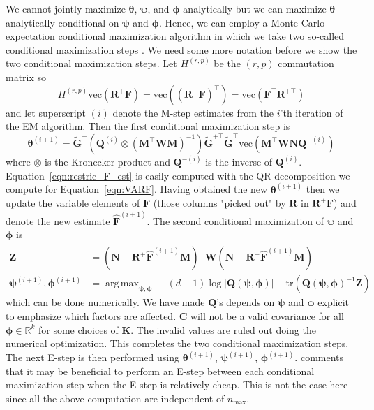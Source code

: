 \documentclass[notitlepage]{article}
\DeclareMathOperator*{\argmax}{arg\,max}
\renewcommand{\vec}[1]{\bm{#1}}
\newcommand{\mat}[1]{\mathbf{#1}}
\newcommand{\Lparen}[1]{\left( #1\right)}
\newcommand{\Lvert}[1]{\left\vert #1\right\vert}
\newcommand{\optor}[2]{#1\Lparen{#2}}
\newcommand{\vecOP}[1]{\optor{\text{vec}}{#1}}
\newcommand{\dimState}{p}
\newcommand{\dimRng}{r}
\newcommand{\nPeriods}{d}
\newcommand{\nMax}{n_{\text{max}}}
\begin{document}
We cannot jointly maximize $\vec{\theta}$, $\vec{\psi}$, and $\vec{\phi}$ analytically but we can maximize $\vec{\theta}$ analytically conditional on $\vec{\psi}$ and $\vec{\phi}$. Hence, we can employ a Monte Carlo expectation conditional maximization algorithm in which we take two so-called conditional maximization steps \citep[see][on the, non-Monte Carlo, expectation maximization algorithm]{meng93}. We need some more notation before we show the two conditional maximization steps. Let $H^{(\dimRng, \dimState)}$ be the $(\dimRng, \dimState)$ commutation matrix so %
%
$$
H^{(\dimRng, \dimState)}\vecOP{\mat{R}^+\mat{F}} 
	= \vecOP{\Lparen{\mat{R}^+\mat{F}}^\top}
	= \vecOP{\mat{F}^\top\mat{R}^{+\top}}
$$%
%
and let superscript $(i)$ denote the M-step estimates from the $i$'th iteration of the EM algorithm. Then the first conditional maximization step is %
%
\begin{equation}\label{eqn:restric_F_est}
\vec{\theta}^{(i + 1)} =
	\tilde{\mat{G}}^+
	\Lparen{\mat{Q}^{(i)} \otimes \Lparen{\mat{M}^\top\mat{W}\mat{M}}^{-1}}
	\tilde{\mat{G}}^{+\top}\tilde{\mat{G}}^\top	
	\vecOP{\mat{M}^\top\mat{W}\mat{N}\mat{Q}^{-(i)}}
\end{equation}%
% 
where $\otimes$ is the Kronecker product and $\mat{Q}^{-(i)}$ is the inverse of $\mat{Q}^{(i)}$. Equation~\eqref{eqn:restric_F_est} is easily computed with the QR decomposition we compute for Equation~\eqref{eqn:VARF}. Having obtained the new $\vec{\theta}^{(i + 1)}$ then we update the variable elements of $\mat{F}$ (those columns "picked out" by $\mat{R}$ in $\mat{R}^+\mat{F}$) and denote the new estimate $\widehat{\mat{F}}^{(i + 1)}$. The second conditional maximization of $\vec{\psi}$ and $\vec{\phi}$ is %
%
\begin{align*}
\mat{Z} &= \Lparen{\mat{N} - \mat{R}^+\widehat{\mat{F}}^{(i +1)}\mat{M}}^\top\mat{W}
           \Lparen{\mat{N} - \mat{R}^+\widehat{\mat{F}}^{(i +1)}\mat{M}} \\
\vec{\psi}^{(i+1)},\vec{\phi}^{(i+1)} &= \argmax_{\vec{\psi},\vec{\phi}} 
   -(\nPeriods - 1)\log\Lvert{\mat{Q}(\vec{\psi},\vec{\phi})}
   -\text{tr}\Lparen{\mat{Q}(\vec{\psi},\vec{\phi})^{-1}\mat{Z}}
\end{align*}%
% 
which can be done numerically. We have made $\mat{Q}$'s depends on $\vec{\psi}$ and $\vec{\phi}$ explicit to emphasize which factors are affected. $\mat{C}$ will not be a valid covariance for all $\vec{\phi}\in\mathbb{R}^k$ for some choices of $\mat{K}$. The invalid values are ruled out doing the numerical optimization. This completes the two conditional maximization steps. The next E-step is then performed using $\vec{\theta}^{(i + 1)}$, $\vec{\psi}^{(i +1)}$, $\vec{\phi}^{(i + 1)}$. \citet[][see the discussion]{meng93} comments that it may be beneficial to perform an E-step between each conditional maximization step when the E-step is relatively cheap. This is not the case here since all the above computation are independent of $\nMax$.
\end{document}
